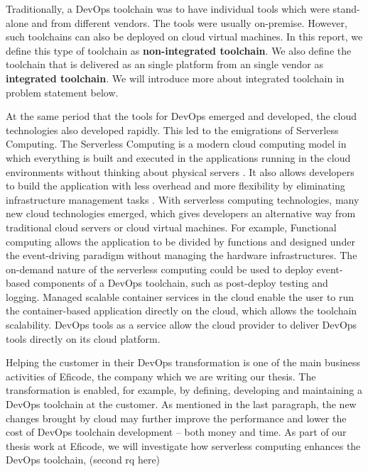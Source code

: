 \par
Traditionally, a DevOps toolchain was to have individual tools which were stand-alone and from different vendors. The tools were usually on-premise. However, such toolchains can also be deployed on cloud virtual machines. In this report, we define this type of toolchain as \textbf{non-integrated toolchain}.
We also define the toolchain that is delivered as an single platform from an single vendor as \textbf{integrated toolchain}. We will introduce more about integrated toolchain in problem statement below.
\par
At the same period that the tools for DevOps emerged and developed, the cloud technologies also developed rapidly. This led to the emigrations of Serverless Computing. 
The Serverless Computing is a modern cloud computing model in which everything is built and executed in the applications running in the cloud environments without thinking about physical servers \cite{Serverle81:online}. It also allows developers to build the application with less overhead \cite{Serverle81:online} and more flexibility by eliminating infrastructure management tasks \cite{Serverle73:online}.
With serverless computing technologies, many new cloud technologies emerged, which gives developers an alternative way from traditional cloud servers or cloud virtual machines. For example, Functional computing allows the application to be divided by functions and designed under the event-driving paradigm without managing the hardware infrastructures. The on-demand nature of the serverless computing could be used to deploy event-based components of a DevOps toolchain, such as post-deploy testing and logging.
Managed scalable container services in the cloud enable the user to run the container-based application directly on the cloud, which allows the toolchain scalability. DevOps tools as a service \cite{DevOpsas45:online} allow the cloud provider to deliver DevOps tools directly on its cloud platform.
\par
Helping the customer in their DevOps transformation is one of the main business activities of Eficode, the company which we are writing our thesis. The transformation is enabled, for example, by defining, developing and maintaining a DevOps toolchain at the customer. As mentioned in the last paragraph, the new changes brought by cloud may further improve the performance and lower the cost of DevOps toolchain development -- both money and time. As part of our thesis work at Eficode, we will investigate how serverless computing enhances the DevOps toolchain, (second rq here)
